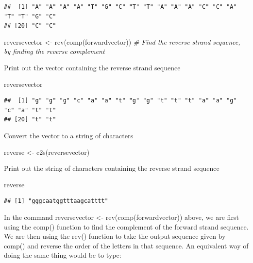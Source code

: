\documentclass[
]{book}
\newenvironment{Shaded}{\begin{snugshade}}{\end{snugshade}}
\newcommand{\CommentTok}[1]{\textcolor[rgb]{0.56,0.35,0.01}{\textit{#1}}}
\newcommand{\FunctionTok}[1]{\textcolor[rgb]{0.00,0.00,0.00}{#1}}
\newcommand{\NormalTok}[1]{#1}
\newcommand{\OtherTok}[1]{\textcolor[rgb]{0.56,0.35,0.01}{#1}}
\begin{document}
\begin{verbatim}
##  [1] "A" "A" "A" "A" "T" "G" "C" "T" "T" "A" "A" "A" "C" "C" "A" "T" "T" "G" "C"
## [20] "C" "C"
\end{verbatim}

\begin{Shaded}
\begin{Highlighting}[]
\NormalTok{reversevector }\OtherTok{\textless{}{-}} \FunctionTok{rev}\NormalTok{(}\FunctionTok{comp}\NormalTok{(forwardvector))    }\CommentTok{\# Find the reverse strand sequence, by finding the reverse complement}
\end{Highlighting}
\end{Shaded}

Print out the vector containing the reverse strand sequence

\begin{Shaded}
\begin{Highlighting}[]
\NormalTok{reversevector                             }
\end{Highlighting}
\end{Shaded}

\begin{verbatim}
##  [1] "g" "g" "g" "c" "a" "a" "t" "g" "g" "t" "t" "t" "a" "a" "g" "c" "a" "t" "t"
## [20] "t" "t"
\end{verbatim}

Convert the vector to a string of characters

\begin{Shaded}
\begin{Highlighting}[]
\NormalTok{reverse }\OtherTok{\textless{}{-}} \FunctionTok{c2s}\NormalTok{(reversevector)                }
\end{Highlighting}
\end{Shaded}

Print out the string of characters containing the reverse strand sequence

\begin{Shaded}
\begin{Highlighting}[]
\NormalTok{reverse                                      }
\end{Highlighting}
\end{Shaded}

\begin{verbatim}
## [1] "gggcaatggtttaagcatttt"
\end{verbatim}

In the command reversevector \textless- rev(comp(forwardvector)) above, we are first using the comp() function to find the complement of the forward strand sequence. We are then using the rev() function to take the output sequence given by comp() and reverse the order of the letters in that sequence. An equivalent way of doing the same thing would be to type:
\end{document}
